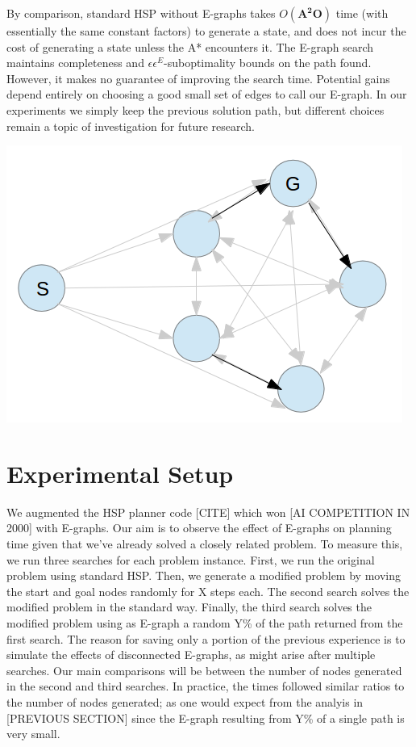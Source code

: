 \documentclass[letterpaper]{article}
\begin{document}
By comparison, standard HSP without E-graphs takes $O(\mathbf{A^2O})$ time (with essentially the same constant factors) to generate a state, and does not incur the cost of generating a state unless the A* encounters it. The E-graph search maintains completeness and $\epsilon \epsilon^E$-suboptimality bounds on the path found. However, it makes no guarantee of improving the search time. Potential gains depend entirely on choosing a good small set of edges to call our E-graph. In our experiments we simply keep the previous solution path, but different choices remain a topic of investigation for future research.

\includegraphics[scale=0.4]{Pentagon.png}

\section{Experimental Setup}

We augmented the HSP planner code [CITE] which won [AI COMPETITION IN 2000] with E-graphs. Our aim is to observe the effect of E-graphs on planning time given that we've already solved a closely related problem. To measure this, we run three searches for each problem instance. First, we run the original problem using standard HSP. Then, we generate a modified problem by moving the start and goal nodes randomly for X steps each. The second search solves the modified problem in the standard way. Finally, the third search solves the modified problem using as E-graph a random Y\% of the path returned from the first search. The reason for saving only a portion of the previous experience is to simulate the effects of disconnected E-graphs, as might arise after multiple searches. Our main comparisons will be between the number of nodes generated in the second and third searches. In practice, the times followed similar ratios to the number of nodes generated; as one would expect from the analyis in [PREVIOUS SECTION] since the E-graph resulting from Y\% of a single path is very small.
\end{document}
